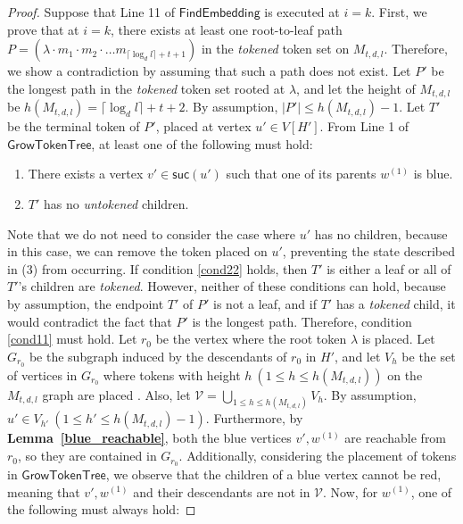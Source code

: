 \documentclass[runningheads]{llncs}
\theoremstyle{plain}
\theoremstyle{definition}
\begin{document}
\begin{proof}
    Suppose that Line 11 of $\mathsf{FindEmbedding}$ is executed at $i = k$. First, we prove that at $i = k$, there exists at least one root-to-leaf path $P = (\lambda \cdot m_1 \cdot m_2 \cdot \dots m_{\lceil \log_d l \rceil +t+1})$ in the \textit{tokened} token set on $M_{t, d, l}$. Therefore, we show a contradiction by assuming that such a path does not exist. Let $P'$ be the longest path in the \textit{tokened} token set rooted at $\lambda$, and let the height of $M_{t, d, l}$ be $h(M_{t, d, l}) = \lceil \log_d l \rceil +t+2$. By assumption, $|P'| \leq h(M_{t, d, l}) - 1$. Let $T'$ be the terminal token of $P'$, placed at vertex $u' \in V[H']$. From Line 1 of $\mathsf{GrowTokenTree}$, at least one of the following must hold:
    
    \begin{enumerate}
        \item There exists a vertex $v' \in \mathsf{suc}(u')$ such that one of its parents $w^{(1)}$ is blue. \label{cond11}
        \item $T'$ has no \textit{untokened} children. \label{cond22}
    \end{enumerate}
    
    Note that we do not need to consider the case where $u'$ has no children, because in this case, we can remove the token placed on $u'$, preventing the state described in (3) from occurring. If condition \ref{cond22} holds, then $T'$ is either a leaf or all of $T'$'s children are \textit{tokened}. However, neither of these conditions can hold, because by assumption, the endpoint $T'$ of $P'$ is not a leaf, and if $T'$ has a \textit{tokened} child, it would contradict the fact that $P'$ is the longest path. Therefore, condition \ref{cond11} must hold. Let $r_0$ be the vertex where the root token $\lambda$ is placed. Let $G_{r_0}$ be the subgraph induced by the descendants of $r_0$ in $H'$, and let $V_h$ be the set of vertices in $G_{r_0}$ where tokens with height $h\ (1 \leq h \leq h(M_{t, d, l}))$ on the $M_{t, d, l}$ graph are placed . Also, let $\mathcal{V} = \bigcup_{1 \leq h \leq h(M_{t, d, l})} V_h$. By assumption, $u' \in V_{h'}\ (1 \leq h' \leq h(M_{t, d, l})-1)$. Furthermore, by \textbf{Lemma~\ref{blue_reachable}}, both the blue vertices $v', w^{(1)}$ are reachable from $r_0$, so they are contained in $G_{r_0}$. Additionally, considering the placement of tokens in $\mathsf{GrowTokenTree}$, we observe that the children of a blue vertex cannot be red, meaning that $v', w^{(1)}$ and their descendants are not in $\mathcal{V}$. Now, for $w^{(1)}$, one of the following must always hold:


\end{proof}
\end{document}
